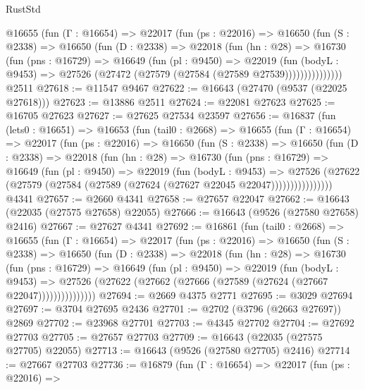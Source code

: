 \begin{lexlean}{RustStd}
\begin{coremodule}
        @16655
          (fun (Γ : @16654) =>
          @22017
            (fun (ps : @22016) =>
            @16650
              (fun (S : @2338) =>
              @16650
                (fun (D : @2338) =>
                @22018
                  (fun (hn : @28) =>
                  @16730
                    (fun (pns : @16729) =>
                    @16649
                      (fun (pl : @9450) =>
                      @22019
                        (fun (bodyL : @9453) =>
                        @27526 (@27472 (@27579 (@27584 (@27589 @27539)))))))))))))))
    @2511
@27618 := @11547 @9467
@27622 := @16643 (@27470 (@9537 (@22025 @27618)))
@27623 := @13886 @2511
@27624 := @22081 @27623
@27625 := @16705 @27623
@27627 := @27625 @27534 @23597
@27656 := @16837
    (fun (lets0 : @16651) =>
    @16653
      (fun (tail0 : @2668) =>
      @16655
        (fun (Γ : @16654) =>
        @22017
          (fun (ps : @22016) =>
          @16650
            (fun (S : @2338) =>
            @16650
              (fun (D : @2338) =>
              @22018
                (fun (hn : @28) =>
                @16730
                  (fun (pns : @16729) =>
                  @16649
                    (fun (pl : @9450) =>
                    @22019
                      (fun (bodyL : @9453) =>
                      @27526
                        (@27622
                          (@27579 (@27584 (@27589 (@27624 (@27627 @22045 @22047))))))))))))))))
    @4341
@27657 := @2660 @4341
@27658 := @27657 @22047
@27662 := @16643 (@22035 (@27575 @27658) @22055)
@27666 := @16643 (@9526 (@27580 @27658) @2416)
@27667 := @27627 @4341
@27692 := @16861
    (fun (tail0 : @2668) =>
    @16655
      (fun (Γ : @16654) =>
      @22017
        (fun (ps : @22016) =>
        @16650
          (fun (S : @2338) =>
          @16650
            (fun (D : @2338) =>
            @22018
              (fun (hn : @28) =>
              @16730
                (fun (pns : @16729) =>
                @16649
                  (fun (pl : @9450) =>
                  @22019
                    (fun (bodyL : @9453) =>
                    @27526 (@27622 (@27662 (@27666 (@27589 (@27624 (@27667 @22047)))))))))))))))
@27694 := @2669 @4375 @2771
@27695 := @3029 @27694
@27697 := @3704 @27695 @2436
@27701 := @2702 (@3796 (@2663 @27697)) @2869
@27702 := @23968 @27701
@27703 := @4345 @27702
@27704 := @27692 @27703
@27705 := @27657 @27703
@27709 := @16643 (@22035 (@27575 @27705) @22055)
@27713 := @16643 (@9526 (@27580 @27705) @2416)
@27714 := @27667 @27703
@27736 := @16879
    (fun (Γ : @16654) =>
    @22017
      (fun (ps : @22016) =>

\end{coremodule}
\end{lexlean}

